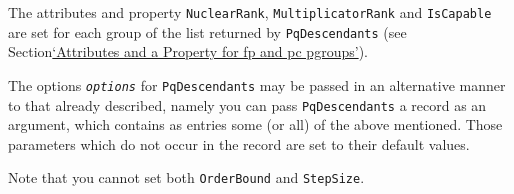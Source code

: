 \documentclass[a4paper,11pt]{report}
\begin{document}
{{{ The attributes and property \texttt{NuclearRank}, \texttt{MultiplicatorRank} and \texttt{IsCapable} are set for each group of the list returned by \texttt{PqDescendants} (see Section{\nobreakspace}\hyperref[Attributes and a Property for fp and pc p-groups]{`Attributes and a Property for fp and pc p\texttt{}groups'}). 

 The options \mbox{\texttt{\mdseries\slshape options}} for \texttt{PqDescendants} may be passed in an alternative manner to that already described, namely you
can pass \texttt{PqDescendants} a record as an argument, which contains as entries some (or all) of the above
mentioned. Those parameters which do not occur in the record are set to their
default values. 

 Note that you cannot set both \texttt{OrderBound} and \texttt{StepSize}. 

}}}
\end{document}
